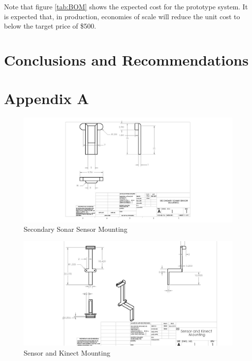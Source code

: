 \documentclass[oneside,final,a4paper]{report}
\begin{document}
Note that figure \ref{tab:BOM} shows the expected cost for the prototype system.  It is expected that, in production, economies of scale will reduce the unit cost to below the target price of \$500.

\chapter{Conclusions and Recommendations}

\chapter*{Appendix A} \label{mech_drawings}
\begin{figure}[hbt]
 \centering
 \includegraphics[scale=0.65]{Drawing_Left}
 \caption{Secondary Sonar Sensor Mounting}
\end{figure}

\begin{figure}[hbt]
 \centering
 \includegraphics[scale=0.5]{Drawing_Right}
 \caption{Sensor and Kinect Mounting}
\end{figure}
\end{document}
